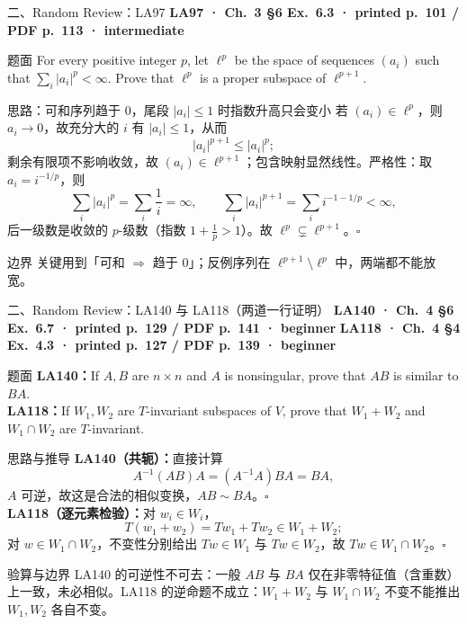 \documentclass[aspectratio=169,10pt,fontset=none]{ctexbeamer}
\newcommand{\ex}[1]{\textcolor{accent}{\footnotesize\bfseries #1}}
\begin{document}
\begin{frame}[t]{二、Random Review：LA97}
  \leavevmode\ex{LA97 · Ch.~3 §6 Ex.~6.3 · printed p.~101 / PDF p.~113 · intermediate}
  \begin{block}{\footnotesize 题面}
    \scriptsize For every positive integer $p$, let $\ell^p$ be the space of sequences $(a_i)$ such that $\sum_i|a_i|^p<\infty$. Prove that $\ell^p$ is a proper subspace of $\ell^{p+1}$.
  \end{block}
  \begin{exampleblock}{\footnotesize 思路：可和序列趋于 $0$，尾段 $|a_i|\le1$ 时指数升高只会变小}
    \scriptsize
    若 $(a_i)\in\ell^p$，则 $a_i\to0$，故充分大的 $i$ 有 $|a_i|\le1$，从而
    $$|a_i|^{p+1}\le|a_i|^p;$$
    剩余有限项不影响收敛，故 $(a_i)\in\ell^{p+1}$；包含映射显然线性。严格性：取 $a_i=i^{-1/p}$，则
    $$\sum_i|a_i|^p=\sum_i\frac1i=\infty,\qquad \sum_i|a_i|^{p+1}=\sum_i i^{-1-1/p}<\infty,$$
    后一级数是收敛的 $p$-级数（指数 $1+\tfrac1p>1$）。故 $\ell^p\subsetneq\ell^{p+1}$。$\square$
  \end{exampleblock}
  \begin{block}{\footnotesize 边界}
    \scriptsize 关键用到「可和 $\Rightarrow$ 趋于 $0$」；反例序列在 $\ell^{p+1}\setminus\ell^p$ 中，两端都不能放宽。
  \end{block}
\end{frame}

\begin{frame}[t]{二、Random Review：LA140 与 LA118（两道一行证明）}
  \leavevmode\ex{LA140 · Ch.~4 §6 Ex.~6.7 · printed p.~129 / PDF p.~141 · beginner}\quad
  \ex{LA118 · Ch.~4 §4 Ex.~4.3 · printed p.~127 / PDF p.~139 · beginner}
  \begin{block}{\footnotesize 题面}
    \scriptsize \textbf{LA140：}If $A,B$ are $n\times n$ and $A$ is nonsingular, prove that $AB$ is similar to $BA$.\\
    \textbf{LA118：}If $W_1,W_2$ are $T$-invariant subspaces of $V$, prove that $W_1+W_2$ and $W_1\cap W_2$ are $T$-invariant.
  \end{block}
  \begin{exampleblock}{\footnotesize 思路与推导}
    \scriptsize
    \textbf{LA140（共轭）：}直接计算
    $$A^{-1}(AB)A=(A^{-1}A)BA=BA,$$
    $A$ 可逆，故这是合法的相似变换，$AB\sim BA$。$\square$\\[3pt]
    \textbf{LA118（逐元素检验）：}对 $w_i\in W_i$，
    $$T(w_1+w_2)=Tw_1+Tw_2\in W_1+W_2;$$
    对 $w\in W_1\cap W_2$，不变性分别给出 $Tw\in W_1$ 与 $Tw\in W_2$，故 $Tw\in W_1\cap W_2$。$\square$
  \end{exampleblock}
  \begin{block}{\footnotesize 验算与边界}
    \scriptsize LA140 的可逆性不可去：一般 $AB$ 与 $BA$ 仅在非零特征值（含重数）上一致，未必相似。LA118 的逆命题不成立：$W_1+W_2$ 与 $W_1\cap W_2$ 不变不能推出 $W_1,W_2$ 各自不变。
  \end{block}
\end{frame}
\end{document}
